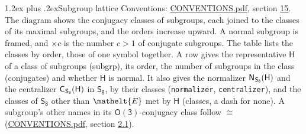 \documentclass[10pt,a4paper]{article}
\makeatletter
\renewcommand\section{\@startsection{section}{1}{\z@}{-3ex plus -1ex minus -.2ex}%
  {1.2ex plus .2ex}{\normalfont\large\sffamily\bfseries\color{parttitle}}}
\numberwithin{equation}{section}
\newcommand{\eltfont}[1]{{\let\sigma\eltsigma\mathelt{#1}}}
\newcommand{\grp}[1]{\mathsf{#1}}
\newcommand{\cls}[1]{\eltfont{#1}}
\newcommand{\samecls}{\cong}
\newcommand{\hairsp}{\mkern1mu}
\makeatother
\begin{document}
\section{Subgroup lattice}\label{s:subgroups}
Conventions: \href{../../CONVENTIONS.pdf}{CONVENTIONS.pdf}, section \href{../../CONVENTIONS.pdf\#conv.15}{15}.
The diagram shows the conjugacy classes of subgroups, each joined to the classes of its maximal subgroups, and the orders increase upward. \label{n:index.conjugates.c}A normal subgroup is framed, and ${\times}c$ is the number $c > 1$ of conjugate subgroups. The table lists the classes by order, those of one symbol together. \label{n:group.H}\label{n:head.subgroup}\label{n:head.order}\label{n:head.conjugates}\label{n:head.normal}A row gives the representative $\grp{H}$ of a class of subgroups (subgrp), its order, the number of subgroups in the class (conjugates) and whether $\grp{H}$ is normal. \label{n:group.normalizer}\label{n:group.centralizer}\label{n:head.classes}It also gives the normalizer $\grp{N}_{\hairsp \grp{S_{8}}}(\grp{H})$ and the centralizer $\grp{C}_{\hairsp \grp{S_{8}}}(\grp{H})$ in $\grp{S_{8}}$, by their classes (\texttt{normalizer}, \texttt{centralizer}), and the classes of $\grp{S_{8}}$ other than $\cls{E}$ met by $\grp{H}$ (classes, a dash for none). A subgroup's other names in its \href{O3.pdf}{$\grp{O(3)}$}-conjugacy class follow $\samecls$ (\href{../../CONVENTIONS.pdf}{CONVENTIONS.pdf}, section \href{../../CONVENTIONS.pdf\#conv.2.1}{2.1}).
\begin{center}
\end{center}
\end{document}
